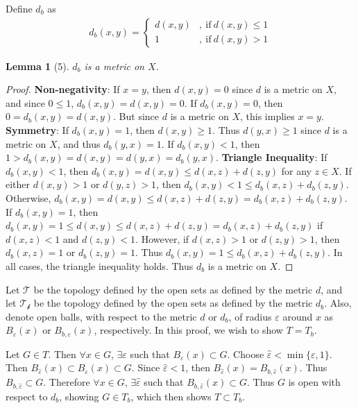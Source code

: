 \documentclass[12pt]{article}
\theoremstyle{plain}
\newtheorem*{lemma*}{Lemma}
\begin{document}
Define $d_b$ as
\begin{align*}
    d_b(x,y) = \left\{\begin{array}{ll}
        d(x,y) &,\ \text{if}\ d(x,y) \leq 1 \\
        1 &,\ \text{if}\ d(x,y) > 1
    \end{array}\right.
\end{align*}
\begin{lemma*}[5]
    $d_b$ is a metric on $X$.
\end{lemma*}
\begin{proof}
    \textbf{Non-negativity}: If $x = y$, then $d(x,y) = 0$ since $d$ is a metric on $X$, and since $0 \leq 1$, $d_b(x,y) = d(x,y) = 0$.  If $d_b(x,y) = 0$, then $0 = d_b(x,y) = d(x,y)$.  But since $d$ is a metric on $X$, this implies $x = y$.  \textbf{Symmetry}: If $d_b(x,y) = 1$, then $d(x,y) \geq 1$.  Thus $d(y,x) \geq 1$ since $d$ is a metric on $X$, and thus $d_b(y,x) = 1$.  If $d_b(x,y) < 1$, then $1 > d_b(x,y) = d(x,y) = d(y,x) = d_b(y,x)$.  \textbf{Triangle Inequality}:  If $d_b(x,y) < 1$, then $d_b(x,y) = d(x,y) \leq d(x,z) + d(z,y)$ for any $z \in X$.  If either $d(x,y) > 1$ or $d(y,z) > 1$, then $d_b(x,y) < 1 \leq d_b(x,z) + d_b(z,y)$.  Otherwise, $d_b(x,y) = d(x,y) \leq d(x,z) + d(z,y) = d_b(x,z) + d_b(z,y)$.  If $d_b(x,y) = 1$, then $d_b(x,y) = 1 \leq d(x,y) \leq d(x,z) + d(z,y) = d_b(x,z) + d_b(z,y)$ if $d(x,z) < 1$ and $d(z,y) < 1$.  However, if $d(x,z) > 1$ or $d(z,y) > 1$, then $d_b(x,z) = 1$ or $d_b(z,y) = 1$.  Thus $d_b(x,y) = 1 \leq d_b(x,z) + d_b(z,y)$.  In all cases, the triangle inequality holds.  Thus $d_b$ is a metric on $X$.
\end{proof}

Let $\mathcal{T}$ be the topology defined by the open sets as defined by the metric $d$, and let $\mathcal{T_b}$ be the topology defined by the open sets as defined by the metric $d_b$.  Also, denote open balls, with respect to the metric $d$ or $d_b$, of radius $\varepsilon$ around $x$ as $B_\varepsilon(x)$ or $B_{b,\varepsilon}(x)$, respectively.  In this proof, we wish to show $T = T_b$.

Let $G \in T$.  Then $\forall x \in G$, $\exists \varepsilon$ such that $B_{\varepsilon}(x) \subset G$.  Choose $\hat{\varepsilon} < \min\{\varepsilon, 1\}$.  Then $B_{\hat{\varepsilon}}(x) \subset B_{\varepsilon}(x) \subset G$.  Since $\hat{\varepsilon} < 1$, then $B_{\hat{\varepsilon}}(x) = B_{b,\hat{\varepsilon}}(x)$.  Thus $B_{b,\hat{\varepsilon}} \subset G$.  Therefore $\forall x \in G$, $\exists \hat{\varepsilon}$ such that $B_{b,\hat{\varepsilon}}(x) \subset G$.  Thus $G$ is open with respect to $d_b$, showing $G \in T_b$, which then shows $T\subset T_b$.
\end{document}
